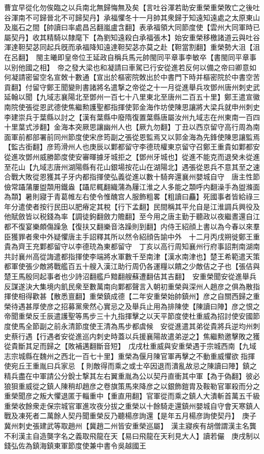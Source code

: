 曹宜早從化勿俟臨之以兵南北無歸悔無及矣【言吐谷渾若助安重榮重榮敗亡之後吐谷渾南不可歸晉北不可歸契丹】承福懼冬十一月帥其衆歸于知遠知遠處之太原東山及嵐石之間【帥讀曰率處昌呂翻嵐盧含翻】表承福領大同節度使【雲州大同軍時已屬契丹】收其精騎以隸麾下【為劉知遠殺白承福張木】始安重榮移檄諸道云與吐谷渾達靼契苾同起兵旣而承福降知遠達靼契苾亦莫之赴【靼當割翻】重榮勢大沮【沮在呂翻】　閩主曦即皇帝位王延政自稱兵馬元帥閩同平章事李敏卒【書閩同平章事以别他國之相】　帝之發大梁也和凝請曰車駕已行安從進若反何以備之帝曰卿意如何凝請密留空名宣敇十數通【宣出於樞密院敇出於中書門下時并樞密院於中書空苦貢翻】付留守鄭王聞變則書諸將名遣撃之帝從之十一月從進舉兵攻鄧州唐州刺史武延翰以聞【九域志襄陽北至鄧州一百七十八里東北至唐州二百五十里】鄭王遣宣徽南院使張從恩武德使焦繼勲護聖都指揮使郭金海作坊使陳思讓將大梁兵就申州刺史李建崇兵于葉縣以討之【漢有葉縣中廢隋復置葉縣唐屬汝州九域志在州東南一百四十里葉式涉翻】金海本突厥思讓幽州人也【厥九勿翻】丁丑以西京留守高行周為南面軍前都部署前同州節度使宋彦筠副之張從恩監焉又以郭金海為先鋒使陳思讓監焉【監古銜翻】彦筠滑州人也庚辰以鄴都留守李德珫權東京留守召鄭王重貴如鄴都安從進攻鄧州威勝節度使安審暉據牙城拒之【鄧州牙城也】從進不能克而退癸未從進至花山【九域志唐州湖陽縣有花山銀場按花山在湖陽北】遇張從恩兵不意其至之速合戰大敗從恩獲其子牙内都指揮使弘義從進以數十騎奔還襄州嬰城自守　唐主性節儉常躡蒲屢盥頮用鐵盎【躡尼輒翻織蒲為屨江淮之人多能之頮呼内翻澡手為盥滌面為頮】暑則寢于青葛帷左右使令惟醜宫人服飾粗畧【粗讀曰麤】死國事者皆給祿三年分遣使者按行民田以肥瘠定其稅【行下孟翻】民間稱其平允自是江淮調兵興役及他賦斂皆以税錢為率【調徒鉤翻斂力贍翻】至今用之唐主勤于聽政以夜繼晝還自江都不復宴樂頗傷躁急【復扶又翻樂音洛躁則到翻】内侍王紹顔上書以為今春以來羣臣獲罪者衆中外疑懼唐主手詔釋其所以然令紹顔告諭中外　十二月丙戌朔徙鄭王重貴為齊王充鄴都留守以李德珫為東都留守　丁亥以高行周知襄州行府事詔荆南湖南共討襄州高從誨遣都指揮使李端將水軍數千至南津【漢水南津也】楚王希範遣天策都軍使張少敵將戰艦百五十艘入漢江助行周仍各運糧以饋之少敵佶之子也【張佶與楚王馬殷同起事者也少詩沼翻艦戶黯翻艘蘇遭翻佶其吉翻】　安重榮聞安從進舉兵反謀遂決大集境内飢民衆至數萬南向鄴都聲言入朝初重榮與深州人趙彦之俱為散指揮使相得歡甚【散悉亶翻】重榮鎮成德【二年安重榮始帥鎮州】彦之自關西歸之重榮待遇甚厚使彦之招募黨衆然心實忌之及舉兵止用為排陳使【陳讀曰陣】彦之恨之帝聞重榮反壬辰遣護聖等馬步三十九指揮擊之以天平節度使杜重威為招討使安國節度使馬全節副之前永清節度使王清為馬步都虞候　安從進遣其弟從貴將兵逆均州刺史蔡行遇【行遇者安從進巡内刺史時蓋以兵援襄陽故遣弟逆之】焦繼勲邀擊敗之獲從貴斷其足而歸之【敗補邁翻斷音短】　戊戌杜重威與安重榮遇于宗城西南【九域志宗城縣在魏州之西北一百七十里】重榮為偃月陳官軍再擊之不動重威懼欲指揮使宛丘王重胤曰兵家忌【則敵得而乘之或士卒因退而潰亂故忌之陳讀曰陣】鎮之精兵盡在中軍請公分銳士撃其左右翼重胤為公以契丹直衝其中軍【為于偽翻】彼必狼狽重威從之鎮人陳稍却趙彦之卷旗策馬來降彦之以銀飾鎧胄及鞍勒官軍殺而分之重榮聞彦之叛大懼退匿于輜重中【重直用翻】官軍從而乘之鎮人大潰斬首萬五千級重榮收餘衆走保宗城官軍進攻夜分拔之重榮以十餘騎走還鎮州嬰城自守會天寒鎮人戰及凍死者二萬餘人契丹聞重榮反乃聽楊彦詢還【是年五月楊彦詢使契丹】　庚子冀州刺史張建武等取趙州【冀趙二州皆安重榮巡屬】　漢主寢疾有胡僧謂漢主名龔不利漢主自造龑字名之義取飛龍在天【易曰飛龍在天利見大人】讀若儼　庚戌制以錢弘佐為鎮海鎮東軍節度使兼中書令吳越國王

